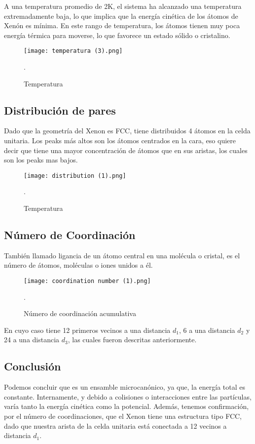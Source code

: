 \documentclass[10pt,letterpaper,twocolumn]{article}
\begin{document}
A una temperatura promedio de 2K, el sistema ha alcanzado una temperatura extremadamente baja, 
lo que implica que la energía cinética de los átomos de Xenón es mínima. En este rango de 
temperatura, los átomos tienen muy poca energía térmica para moverse, lo que favorece un 
estado sólido o cristalino.

\begin{figure}[h]
	\centering
	\texttt{[image: temperatura (3).png]}
	\caption{Temperatura}.
\end{figure}

\subsection*{Distribución de pares}

Dado que la geometría del Xenon es FCC, tiene distribuidos 4 átomos en la celda 
unitaria. Los peaks más altos son los átomos centrados en la cara, eso quiere decir 
que tiene una mayor concentración de átomos que en sus aristas, los cuales son los 
peaks mas bajos. 

\begin{figure}[h]
	\centering
	\texttt{[image: distribution (1).png]}
	\caption{Temperatura}.
\end{figure}

\subsection*{Número de Coordinación}

También llamado ligancia de un átomo central en una molécula o cristal, es el número 
de átomos, moléculas o iones unidos a él.

\begin{figure}[h]
	\centering
	\texttt{[image: coordination number (1).png]}
	\caption{Número de coordinación acumulativa}.
\end{figure}

En cuyo caso tiene 12 primeros vecinos a una distancia $d_{1}$, 6 a una distancia 
$d_{2}$ y 24 a una distancia $d_{3}$, las cuales fueron descritas anteriormente.

\subsection*{Conclusión}

Podemos concluir que es un ensamble microcanónico, ya que, la energía total 
es constante. Internamente, y debido a colisiones o interacciones entre las 
partículas, varía tanto la energía cinética como la potencial. Además, 
tenemos confirmación, por el número de coordinaciones, que el Xenon tiene
una estructura tipo FCC, dado que nuestra arista de la celda unitaria está
conectada a 12 vecinos a distancia $d_{1}$.
\end{document}
